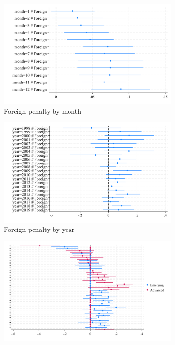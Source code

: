 \documentclass[letterpaper,12pt]{article}
\begin{document}
\begin{landscape}
\begin{figure}[H]
	
	\begin{subfigure}[b]{0.65\textwidth}
		\centering
		\includegraphics[width=1\linewidth]{../output/figures/heterogeneity_by_month.pdf}
		\caption{Foreign penalty by month}
	\end{subfigure}
	\hfill
	\begin{subfigure}[b]{0.65\textwidth}
		\centering
		\includegraphics[width=1\linewidth]{../output/figures/heterogeneity_by_year.pdf}
		\caption{Foreign penalty by year}
	\end{subfigure}
	\hfill
	\begin{subfigure}[b]{0.65\textwidth}
		\centering
		\includegraphics[width=1\linewidth]{../output/figures/heterogeneity_by_cty.pdf}

\end{subfigure}
\end{figure}
\end{landscape}
\end{document}
